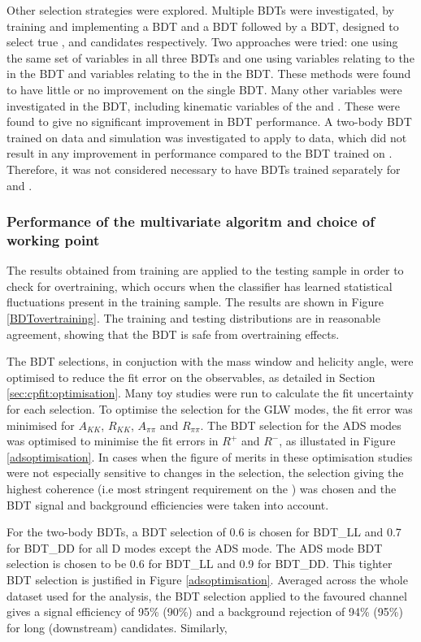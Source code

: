 Other selection strategies were explored. Multiple BDTs were investigated, by training and implementing a \KS BDT and a \Dz BDT followed by a \B BDT, designed to select true \KS, \Dz and \B candidates respectively. Two approaches were tried: one using the same set of variables in all three BDTs and one using variables relating to the \KS in the \KS BDT and variables relating to the \Dz in the \Dz BDT. These methods were found to have little or no improvement on the single BDT. Many other variables were investigated in the BDT, including kinematic variables of the \B and \D. These were found to give no significant improvement in BDT performance. A two-body BDT trained on \runtwo data and simulation was investigated to apply to \runtwo data, which did not result in any improvement in performance compared to the BDT trained on \runone. Therefore, it was not considered necessary to have BDTs trained separately for \runone and \runtwo.

\subsubsection{Performance of the multivariate algoritm and choice of working point}

The results obtained from training are applied to the testing sample in order to check for overtraining, which occurs when the classifier has learned statistical fluctuations present in the training sample. The results are shown in Figure \ref{BDTovertraining}. The training and testing distributions are in reasonable agreement, showing that the BDT is safe from overtraining effects.

The BDT selections, in conjuction with the \Kstarm mass window and \KS helicity angle, were optimised to reduce the fit error on the \CP observables, as detailed in Section \ref{sec:cpfit:optimisation}. Many toy studies were run to calculate the fit uncertainty for each selection. To optimise the selection for the GLW modes, the fit error was minimised for $A_{KK}$, $R_{KK}$, $A_{\pi\pi}$ and $R_{\pi\pi}$. The BDT selection for the ADS modes was optimised to minimise the fit errors in $R^+$ and $R^-$, as illustated in Figure \ref{adsoptimisation}. In cases when the figure of merits in these optimisation studies were not especially sensitive to changes in the selection, the selection giving the highest coherence (i.e most stringent requirement on the \Kstarm) was chosen and the BDT signal and background efficiencies were taken into account.

For the two-body BDTs, a BDT selection of 0.6 is chosen for BDT\_LL and 0.7 for BDT\_DD for all D modes except the ADS mode. The ADS mode BDT selection is chosen to be 0.6 for BDT\_LL and 0.9 for BDT\_DD. This tighter BDT selection is justified in Figure \ref{adsoptimisation}. Averaged across the whole dataset used for the analysis, the BDT selection applied to the favoured \decay{\Bm}{\D(\Km\pip)\Kstarm} channel gives a signal efficiency of 95\% (90\%) and a background rejection of 94\% (95\%) for long (downstream) candidates. Similarly, 

